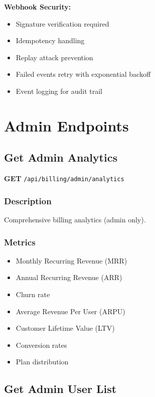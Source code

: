 \documentclass[11pt,a4paper]{report}
\begin{document}
\begin{infobox}
\textbf{Webhook Security:}
\begin{itemize}[leftmargin=*]
    \item Signature verification required
    \item Idempotency handling
    \item Replay attack prevention
    \item Failed events retry with exponential backoff
    \item Event logging for audit trail
\end{itemize}
\end{infobox}

\section{Admin Endpoints}

\subsection{Get Admin Analytics}

\textbf{GET} \texttt{/api/billing/admin/analytics}

\subsubsection{Description}
Comprehensive billing analytics (admin only).

\subsubsection{Metrics}
\begin{itemize}[leftmargin=*]
    \item Monthly Recurring Revenue (MRR)
    \item Annual Recurring Revenue (ARR)
    \item Churn rate
    \item Average Revenue Per User (ARPU)
    \item Customer Lifetime Value (LTV)
    \item Conversion rates
    \item Plan distribution
\end{itemize}

\subsection{Get Admin User List}
\end{document}
